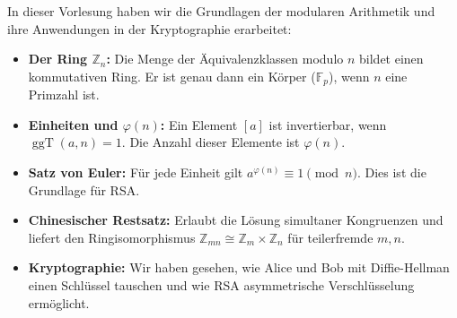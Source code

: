 \begin{nice-box}
In dieser Vorlesung haben wir die Grundlagen der modularen Arithmetik und ihre Anwendungen in der Kryptographie erarbeitet:
\begin{itemize}
    \item \textbf{Der Ring $\mathbb{Z}_n$:} Die Menge der Äquivalenzklassen modulo $n$ bildet einen kommutativen Ring. Er ist genau dann ein Körper ($\mathbb{F}_p$), wenn $n$ eine Primzahl ist.
    \item \textbf{Einheiten und $\varphi(n)$:} Ein Element $[a]$ ist invertierbar, wenn $\operatorname{ggT}(a, n) = 1$. Die Anzahl dieser Elemente ist $\varphi(n)$.
    \item \textbf{Satz von Euler:} Für jede Einheit gilt $a^{\varphi(n)} \equiv 1 \pmod n$. Dies ist die Grundlage für RSA.
    \item \textbf{Chinesischer Restsatz:} Erlaubt die Lösung simultaner Kongruenzen und liefert den Ringisomorphismus $\mathbb{Z}_{mn} \cong \mathbb{Z}_m \times \mathbb{Z}_n$ für teilerfremde $m, n$.
    \item \textbf{Kryptographie:} Wir haben gesehen, wie Alice und Bob mit Diffie-Hellman einen Schlüssel tauschen und wie RSA asymmetrische Verschlüsselung ermöglicht.
\end{itemize}
\end{nice-box}

